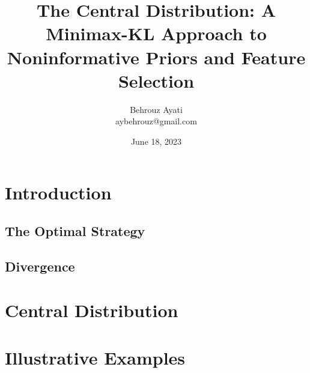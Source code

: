\documentclass[a4paper, 12pt]{article}
\title{The Central Distribution: A Minimax-KL Approach to Noninformative Priors and Feature Selection}
\author{Behrouz Ayati \\ aybehrouz@gmail.com}
\date{June 18, 2023}
\theoremstyle{definition}
\begin{document}
    \maketitle

    \section{Introduction}\label{sec:intro}

    \subsection{The Optimal Strategy}
    

    \subsection{Divergence}\label{sec:dive}
    

    \newpage
    \section{Central Distribution}\label{sec:central}
    

    \newpage


    \section{Illustrative Examples}\label{sec:examples}
    
%
%        

    \newpage

    
    
\end{document}
